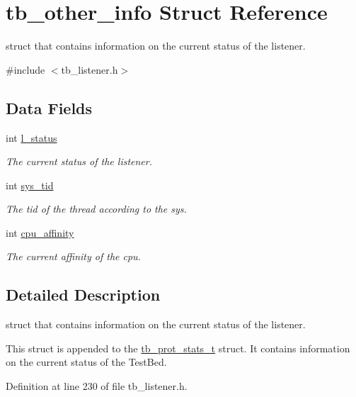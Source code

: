 \hypertarget{structtb__other__info}{\section{tb\-\_\-other\-\_\-info Struct Reference}
\label{structtb__other__info}
}


struct that contains information on the current status of the listener.  




{\ttfamily \#include $<$tb\-\_\-listener.\-h$>$}

\subsection*{Data Fields}
\begin{DoxyCompactItemize}
\item 
int \hyperlink{structtb__other__info_a35fe7496a6493a097350d748cf5d8908}{l\-\_\-status}
\begin{DoxyCompactList}\small\item\em The current status of the listener. \end{DoxyCompactList}\item 
int \hyperlink{structtb__other__info_a053be2f9198a10c7329b11c19dfc6fe4}{sys\-\_\-tid}
\begin{DoxyCompactList}\small\item\em The tid of the thread according to the sys. \end{DoxyCompactList}\item 
int \hyperlink{structtb__other__info_ab7a892d2900125821f3d6b11d003191b}{cpu\-\_\-affinity}
\begin{DoxyCompactList}\small\item\em The current affinity of the cpu. \end{DoxyCompactList}\end{DoxyCompactItemize}


\subsection{Detailed Description}
struct that contains information on the current status of the listener. 

This struct is appended to the \hyperlink{structtb__prot__stats__t}{tb\-\_\-prot\-\_\-stats\-\_\-t} struct. It contains information on the current status of the Test\-Bed. 

Definition at line 230 of file tb\-\_\-listener.\-h.



